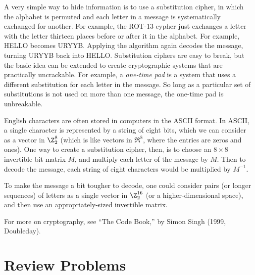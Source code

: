 \begin{remark}  
A very simple way to hide information is to use a substitution cipher, in which the alphabet is permuted and each letter in a message is systematically exchanged for another.  For example, the ROT-13 cypher just exchanges a letter with the letter thirteen places before or after it in the alphabet.  For example, HELLO becomes URYYB.  Applying the algorithm again decodes the message, turning URYYB back into HELLO.  Substitution ciphers are easy to break, but the basic idea can be extended to create cryptographic systems that are practically uncrackable.  For example, a \emph{one-time pad} is a system that uses a different substitution for each letter in the message.  So long as a particular set of substitutions is not used on more than one message, the one-time pad is unbreakable.

English characters are often stored in computers in the ASCII format.  In ASCII, a single character is represented by a string of eight bits, which we can consider as a vector in $\Z_2^8$ (which is like vectors in $\Re^8$, where the entries are zeros and ones).  One way to create a substitution cipher, then, is to choose an $8\times 8$ invertible bit matrix $M$, and multiply each letter of the message by $M$.  Then to decode the message, each string of eight characters would be multiplied by $M^{-1}$.  

To make the message a bit tougher to decode, one could consider pairs (or longer sequences) of letters as a single vector in $\Z_2^{16}$ (or a higher-dimensional space), and then use an appropriately-sized invertible matrix.

For more on cryptography, see ``The Code Book,'' by Simon Singh (1999, Doubleday).
\end{remark}

%
%
%
%
\section{Review Problems}


\newpage


